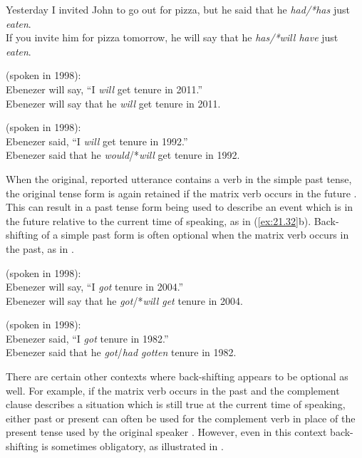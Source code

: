 \ea \label{ex:21.29}
\ea  Yesterday I invited John to go out for pizza, but he said that he \textit{had/*has} just \textit{eaten}.\\
\ex If you invite him for pizza tomorrow, he will say that he \textit{has/*will have} just \textit{eaten}.
                       \z
\z

\ea \label{ex:21.30}
(spoken in 1998):\\
 Ebenezer will say, “I \textit{will} get tenure in 2011.”\\
 Ebenezer will say that he \textit{will} get tenure in 2011.
                       \z
\z

\ea \label{ex:21.31}
(spoken in 1998):\\
 Ebenezer said, “I \textit{will} get tenure in 1992.”\\
 Ebenezer said that he \textit{would}/*\textit{will} get tenure in 1992.
                       \z
\z


When the original, reported utterance contains a verb in the simple past tense, the original tense form is again retained if the matrix verb occurs in the future . This can result in a past tense form being used to describe an event which is in the future relative to the current time of speaking, as in (\ref{ex:21.32}b). Back-shifting of a simple past form is often optional when the matrix verb occurs in the past, as in .


\ea \label{ex:21.32}
(spoken in 1998):\\
 Ebenezer will say, “I \textit{got} tenure in 2004.”\\
 Ebenezer will say that he \textit{got}/*\textit{will get} tenure in 2004.
                       \z
\z

\ea \label{ex:21.33}
(spoken in 1998):\\
 Ebenezer said, “I \textit{got} tenure in 1982.”\\
 Ebenezer said that he \textit{got}/\textit{had gotten} tenure in 1982.
                       \z
\z


There are certain other contexts where back-shifting appears to be optional as well. For example, if the matrix verb occurs in the past and the complement clause describes a situation which is still true at the current time of speaking, either past or present can often be used for the complement verb in place of the present tense used by the original speaker . However, even in this context back-shifting is sometimes obligatory, as illustrated in .


